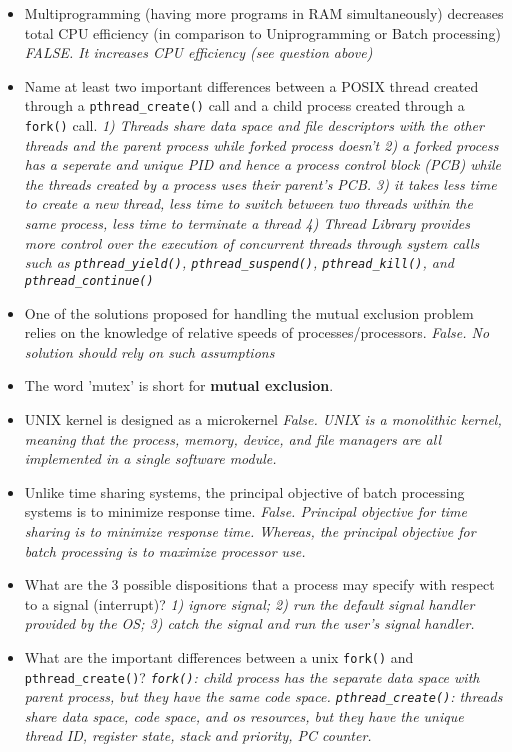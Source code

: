 \documentclass[10pt,landscape]{article}
\begin{document}
\begin{multicols}{4}
\begin{itemize}
    \item Multiprogramming (having more programs in RAM simultaneously) decreases total CPU efficiency (in comparison to Uniprogramming or Batch processing)  \textit{FALSE. It increases CPU efficiency (see question above)}
    \item Name at least two important differences between a POSIX thread created through a \verb$pthread_create()$ call and a child process created through a \verb$fork()$ call.  \textit{1) Threads share data space and file descriptors with the other threads and the parent process while forked process doesn't 2) a forked process has a seperate and unique PID and hence a process control block (PCB) while the threads created by a process uses their parent's PCB.  3) it takes less time to create a new thread, less time to switch between two threads within the same process, less time to terminate a thread 4) Thread Library provides more control over the execution of concurrent threads through system calls such as \texttt{pthread\_yield()}, \texttt{pthread\_suspend()}, \texttt{pthread\_kill()}, and \texttt{pthread\_continue()}}
    \item One of the solutions proposed for handling the mutual exclusion problem relies on the knowledge of relative speeds of processes/processors. \textit{False. No solution should rely on such assumptions}
    \item The word 'mutex' is short for \textbf{mutual exclusion}.
    \item UNIX kernel is designed as a microkernel \textit{False. UNIX is a monolithic kernel, meaning that the process, memory, device, and file managers are all implemented in a single software module.}
    \item Unlike time sharing systems, the principal objective of batch processing systems is to minimize response time. \textit{False. Principal objective for time sharing is to minimize response time. Whereas, the principal objective for batch processing is to maximize processor use.}
    \item What are the 3 possible dispositions that a process may specify with respect to a signal (interrupt)? \textit{1) ignore signal; 2) run the default signal handler provided by the OS; 3) catch the signal and run the user's signal handler.}
    \item What are the important differences between a unix \verb$fork()$ and \verb$pthread_create()$?  \textit{\texttt{fork()}: child process has the separate data space with parent process, but they have the same code space.  \texttt{pthread\_create()}: threads share data space, code space, and os resources, but they have the unique thread ID, register state, stack and priority, PC counter.}

\end{itemize}
\end{multicols}
\end{document}
